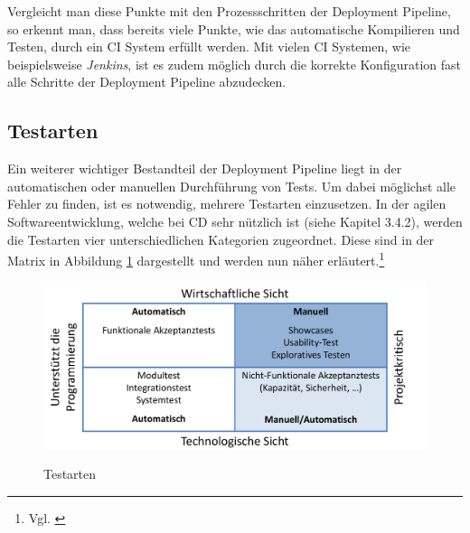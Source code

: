 Vergleicht man diese Punkte mit den Prozessschritten der Deployment Pipeline, so erkennt man, dass bereits viele Punkte, wie das automatische Kompilieren und Testen, durch ein \acs{CI} System erfüllt werden. Mit vielen \acs{CI} Systemen, wie beispielsweise \textit{Jenkins}, ist es zudem möglich durch die korrekte Konfiguration fast alle Schritte der Deployment Pipeline abzudecken. %

\subsection{Testarten}
Ein weiterer wichtiger Bestandteil der Deployment Pipeline liegt in der automatischen oder manuellen Durchführung von Tests. Um dabei möglichst alle Fehler zu finden, ist es notwendig, mehrere Testarten einzusetzen. In der agilen Softwareentwicklung, welche bei \acs{CD} sehr nützlich  ist (siehe Kapitel 3.4.2), werden die Testarten vier unterschiedlichen Kategorien zugeordnet. Diese sind in der Matrix in Abbildung \ref{img:test_typen} dargestellt und werden nun näher erläutert.\footnote{Vgl. \cite[Kapitel 4]{continuous_dev}} %
\begin{figure}[H]
\vspace{-10pt}
\centering
\includegraphics[width=1\linewidth]{../images/Test_typen.pdf}
\vspace{-30pt}
  \caption{Testarten}  \cite[Grafik 4.1 (übersetzt)]{continuous_dev}
  \vspace{-10pt}
\label{img:test_typen}
\end{figure}

